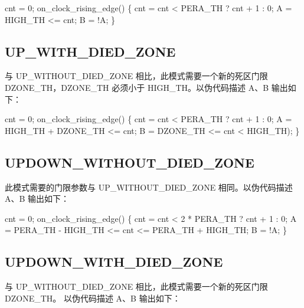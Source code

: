 \documentclass[
  12pt,
]{book}
\newenvironment{Shaded}{\begin{snugshade}}{\end{snugshade}}
\newcommand{\DecValTok}[1]{\textcolor[rgb]{0.00,0.00,0.81}{#1}}
\newcommand{\NormalTok}[1]{#1}
\begin{document}
\begin{Shaded}
\begin{Highlighting}[]
\NormalTok{cnt = }\DecValTok{0}\NormalTok{;}
\NormalTok{on_clock_rising_edge()}
\NormalTok{\{}
\NormalTok{    cnt = cnt < PERA_TH ? cnt + }\DecValTok{1}\NormalTok{ : }\DecValTok{0}\NormalTok{;}
\NormalTok{    A = HIGH_TH <= cnt;}
\NormalTok{    B = !A;}
\NormalTok{\}}
\end{Highlighting}
\end{Shaded}

\hypertarget{up_with_died_zone}{%
\subsection{UP\_WITH\_DIED\_ZONE}\label{up_with_died_zone}}

与 UP\_WITHOUT\_DIED\_ZONE 相比，此模式需要一个新的死区门限 DZONE\_TH，DZONE\_TH
必须小于 HIGH\_TH。以伪代码描述 A、B 输出如下：

cnt = 0;
on\_clock\_rising\_edge()
\{
cnt = cnt \textless{} PERA\_TH ? cnt + 1 : 0;
A = HIGH\_TH + DZONE\_TH \textless= cnt;
B = DZONE\_TH \textless= cnt \textless{} HIGH\_TH);
\}

\hypertarget{updown_without_died_zone}{%
\subsection{UPDOWN\_WITHOUT\_DIED\_ZONE}\label{updown_without_died_zone}}

此模式需要的门限参数与 UP\_WITHOUT\_DIED\_ZONE 相同。以伪代码描述 A、B 输出如下：

\begin{Shaded}
\begin{Highlighting}[]
\NormalTok{cnt = }\DecValTok{0}\NormalTok{;}
\NormalTok{on_clock_rising_edge()}
\NormalTok{\{}
\NormalTok{    cnt = cnt < }\DecValTok{2}\NormalTok{ * PERA_TH ? cnt + }\DecValTok{1}\NormalTok{ : }\DecValTok{0}\NormalTok{;}
\NormalTok{    A = PERA_TH - HIGH_TH <= cnt <= PERA_TH + HIGH_TH;}
\NormalTok{    B = !A;}
\NormalTok{\}}
\end{Highlighting}
\end{Shaded}

\hypertarget{updown_with_died_zone}{%
\subsection{UPDOWN\_WITH\_DIED\_ZONE}\label{updown_with_died_zone}}

与 UP\_WITHOUT\_DIED\_ZONE 相比，此模式需要一个新的死区门限 DZONE\_TH。
以伪代码描述 A、B 输出如下：
\end{document}
